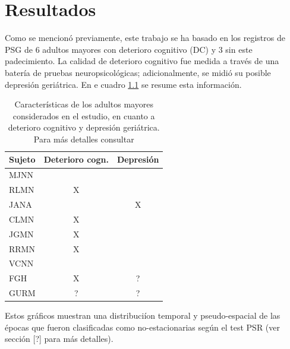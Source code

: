\chapter{Resultados}


Como se mencion\'o previamente, este trabajo se ha basado en los registros de PSG de 6 adultos
mayores con deterioro cognitivo (DC) y 3 sin este padecimiento. La calidad de deterioro
cognitivo fue medida a trav\'es de una bater\'ia de pruebas neuropsicol\'ogicas;
adicionalmente, se midi\'o su posible depresi\'on geri\'atrica. 
En e cuadro \ref{sujetos} se resume esta informaci\'on.

\begin{table}
\centering
\begin{tabular}{l|cc}
Sujeto & Deterioro cogn. & Depresi\'on
\\
\hline
MJNN &   &   \\
RLMN & X &   \\
JANA &   & X \\
CLMN & X &   \\
JGMN & X &   \\
RRMN & X &   \\
VCNN &   &   \\
FGH  & X & ? \\
GURM & ? & ? \\
\end{tabular}
\caption{Caracter\'isticas de los adultos mayores considerados en el estudio, en cuanto
a deterioro cognitivo y depresi\'on geri\'atrica. 
Para m\'as detalles consultar \cite{VazquezTagle16}}
\label{sujetos}
\end{table}

Estos gr\'aficos muestran una distribuci\'ion temporal y pseudo-espacial 
de las \'epocas que fueron clasificadas como {no-estacionarias} seg\'un el test PSR
(ver secci\'on [?] para m\'as detalles). 


